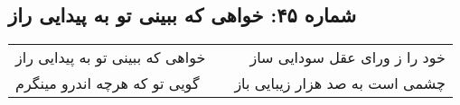 \begin{center}
\section*{شماره ۴۵: خواهی که ببینی تو به پیدایی راز}
\label{sec:045}
\begin{longtable}{l p{0.5cm} r}
خواهی که ببینی تو به پیدایی راز
&&
خود را ز ورای عقل سودایی ساز
\\
گویی تو که هرچه اندرو مینگرم
&&
چشمی است به صد هزار زیبایی باز
\\
\end{longtable}
\end{center}
